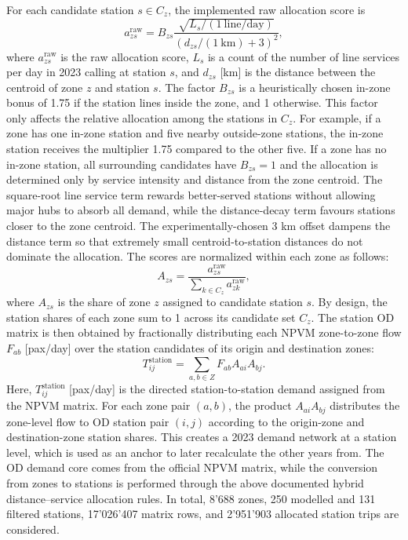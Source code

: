 \documentclass[preprint,12pt]{elsarticle}
\begin{document}
For each candidate station $s\in C_z$, the implemented raw allocation score is
\begin{equation}
 a^{\mathrm{raw}}_{zs}
  =
  B_{zs}
  \frac{\sqrt{L_s/(1\ \mathrm{line/day})}}
  {\left(d_{zs}/(1\ \mathrm{km})+3\right)^{2}},
  \label{eq:zone-station-raw-weight}
\end{equation}
where $a^{\mathrm{raw}}_{zs}$ is the raw allocation score, $L_s$ is a count of the number of line services per day in 2023  calling at station $s$, and $d_{zs}$ [km] is the distance between the centroid of zone $z$ and station $s$. The factor $B_{zs}$ is a heuristically chosen in-zone bonus of 1.75 if the station lines inside the zone, and 1 otherwise. This factor only affects the relative allocation among the stations in $C_z$. For example, if a zone has one in-zone station and five nearby outside-zone stations, the in-zone station receives the multiplier 1.75 compared to the other five. If a zone has no in-zone station, all surrounding candidates have $B_{zs}=1$ and the allocation is determined only by service intensity and distance from the zone centroid. The square-root line service term rewards better-served stations without allowing major hubs to absorb all demand, while the distance-decay term favours stations closer to the zone centroid. The experimentally-chosen 3 km offset dampens the distance term so that extremely small centroid-to-station distances do not dominate the allocation. The scores are normalized within each zone as follows:
\begin{equation}
  A_{zs}=\frac{a^{\mathrm{raw}}_{zs}}{\sum_{k\in C_z}a^{\mathrm{raw}}_{zk}},
  \label{eq:zone-station-share}
\end{equation}
where $A_{zs}$ is the share of zone $z$ assigned to candidate station $s$. By design, the station shares of each zone sum to 1 across its candidate set $C_z$. The station OD matrix is then obtained by fractionally distributing each NPVM zone-to-zone flow $F_{ab}$ [pax/day] over the station candidates of its origin and destination zones:
\begin{equation}
  T^{\mathrm{station}}_{ij}=\sum_{a,b\in Z} F_{ab} A_{ai}A_{bj}.
  \label{eq:station-od-anchor}
\end{equation}
Here, $T^{\mathrm{station}}_{ij}$ [pax/day] is the directed station-to-station demand assigned from the NPVM matrix. For each zone pair $(a,b)$, the product $A_{ai}A_{bj}$ distributes the zone-level flow to OD station pair $(i,j)$ according to the origin-zone and destination-zone station shares. This creates a 2023 demand network at a station level, which is used as an anchor to later recalculate the other years from. The OD demand core comes from the official NPVM matrix, while the conversion from zones to stations is performed through the above documented hybrid distance--service allocation rules. In total, 8'688 zones, 250 modelled and 131 filtered stations, 17'026'407 matrix rows, and 2'951'903 allocated station trips are considered.
\end{document}
